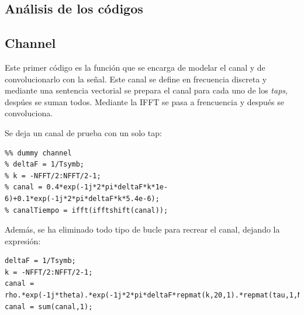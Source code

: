 \documentclass[11pt]{scrartcl} %
\begin{document}
\begin{preview}


\Newpage 

\section{Análisis de los códigos}

\subsection{Channel}

Este primer código es la función que se encarga de modelar el canal y de convolucionarlo con la señal. Este canal se define en frecuencia discreta y mediante una sentencia vectorial se prepara el canal para cada uno de los \emph{taps}, despúes se suman todos. Mediante la IFFT se pasa a frencuencia y después se convoluciona. 

Se deja un canal de prueba con un solo tap:

\begin{verbatim}
%% dummy channel
% deltaF = 1/Tsymb;
% k = -NFFT/2:NFFT/2-1;
% canal = 0.4*exp(-1j*2*pi*deltaF*k*1e-6)+0.1*exp(-1j*2*pi*deltaF*k*5.4e-6);
% canalTiempo = ifft(ifftshift(canal));
\end{verbatim}

Además, se ha eliminado todo tipo de bucle para recrear el canal, dejando la expresión:

\begin{verbatim}
deltaF = 1/Tsymb;
k = -NFFT/2:NFFT/2-1;
canal = rho.*exp(-1j*theta).*exp(-1j*2*pi*deltaF*repmat(k,20,1).*repmat(tau,1,NFFT));
canal = sum(canal,1);
\end{verbatim}


\end{preview}
\end{document}
